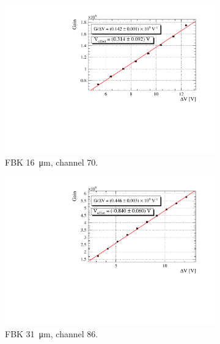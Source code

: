 \begin{figure}[htbp]
  \centering
  \begin{subfigure}{0.48\textwidth}
    \includegraphics[width=\textwidth]{gfx/plots/Gain/16/Gain.pdf}
    \caption{FBK \SI{16}{\micro m}, channel $70$.}
    \label{fig:16 gain}
  \end{subfigure}
  \hfill
  \begin{subfigure}{0.48\textwidth}
    \includegraphics[width=\textwidth]{gfx/plots/Gain/31/Gain.pdf}
    \caption{FBK \SI{31}{\micro m}, channel $86$.}
    \label{fig:31 gain}
  \end{subfigure}
    \begin{subfigure}{0.48\textwidth}

\end{subfigure}
\end{figure}
